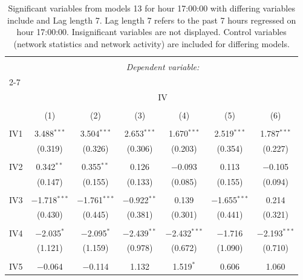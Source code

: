 
\begin{table}[!htbp] \centering 
  \caption{Significant variables from models 13 for hour 17:00:00 with differing variables include 
                               and Lag length 7. Lag length 7 refers to the past 7 hours regressed on hour 17:00:00. 
                               Insignificant variables are not displayed. 
                               Control variables (network statistics and network activity) are 
                               included for differing models.} 
  \label{IVmodels1_t_hourlagged4} 
\scriptsize 
\begin{tabular}{@{\extracolsep{5pt}}lcccccc} 
\\[-1.8ex]\hline 
\hline \\[-1.8ex] 
 & \multicolumn{6}{c}{\textit{Dependent variable:}} \\ 
\cline{2-7} 
\\[-1.8ex] & \multicolumn{6}{c}{IV} \\ 
\\[-1.8ex] & (1) & (2) & (3) & (4) & (5) & (6)\\ 
\hline \\[-1.8ex] 
 IV1 & 3.488$^{***}$ & 3.504$^{***}$ & 2.653$^{***}$ & 1.670$^{***}$ & 2.519$^{***}$ & 1.787$^{***}$ \\ 
  & (0.319) & (0.326) & (0.306) & (0.203) & (0.354) & (0.227) \\ 
  & & & & & & \\ 
 IV2 & 0.342$^{**}$ & 0.355$^{**}$ & 0.126 & $-$0.093 & 0.113 & $-$0.105 \\ 
  & (0.147) & (0.155) & (0.133) & (0.085) & (0.155) & (0.094) \\ 
  & & & & & & \\ 
 IV3 & $-$1.718$^{***}$ & $-$1.761$^{***}$ & $-$0.922$^{**}$ & 0.139 & $-$1.655$^{***}$ & 0.214 \\ 
  & (0.430) & (0.445) & (0.381) & (0.301) & (0.441) & (0.321) \\ 
  & & & & & & \\ 
 IV4 & $-$2.035$^{*}$ & $-$2.095$^{*}$ & $-$2.439$^{**}$ & $-$2.432$^{***}$ & $-$1.716 & $-$2.193$^{***}$ \\ 
  & (1.121) & (1.159) & (0.978) & (0.672) & (1.090) & (0.710) \\ 
  & & & & & & \\ 
 IV5 & $-$0.064 & $-$0.114 & 1.132 & 1.519$^{*}$ & 0.606 & 1.060 \\ 

\end{tabular}
\end{table}
